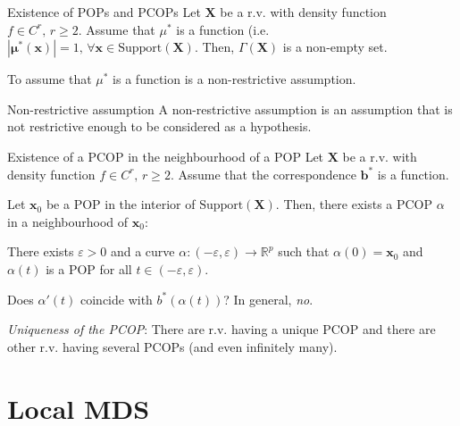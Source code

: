 \begin{theorem}{Existence of POPs and PCOPs}{}
	Let $\boldsymbol X$ be a r.v. with density function $f \in C^r,\, r \geq 2$.
	Assume that $\mu^*$ is a function (i.e. $|\boldsymbol \mu^*(\boldsymbol x)| = 1,\,\forall
		\boldsymbol x \in \text{Support}(\boldsymbol X)$. Then, $\Gamma(\boldsymbol X)$ is a
	non-empty set.
	\tcblower
	\begin{note}
		To assume that $\mu^*$ is a function is a non-restrictive assumption.
	\end{note}
\end{theorem}

\begin{definition}{Non-restrictive assumption}{}
	A non-restrictive assumption is an assumption that is not restrictive enough to
	be considered as a hypothesis.
\end{definition}

\begin{theorem}{Existence of a PCOP in the neighbourhood of a POP}{}
	Let $\boldsymbol X$ be a r.v. with density function $f \in C^r,\, r \geq 2$.
	Assume that the correspondence $\boldsymbol b^*$ is a function.

	Let $\boldsymbol x_0$ be a POP in the interior of $\text{Support}(\boldsymbol X)$.
	Then, there exists a PCOP $\alpha$ in a neighbourhood of $\boldsymbol x_0$:

	There exists $\varepsilon > 0$ and a curve $\alpha : (-\varepsilon, \varepsilon) \to \mathds{R}^p$
	such that $\alpha(0) = \boldsymbol x_0$ and $\alpha(t)$ is a POP for all $t \in (-\varepsilon, \varepsilon)$.

	\tcblower

	\begin{question}{Does $\alpha'(t)$ coincide with $b^*(\alpha(t))$?}{}
		In general, \emph{no}.
	\end{question}

	\begin{note}
		\emph{Uniqueness of the PCOP}: There are r.v. having a unique PCOP and there
		are other r.v. having several PCOPs (and even infinitely many).
	\end{note}
\end{theorem}


\pagebreak
\section{Local MDS}

